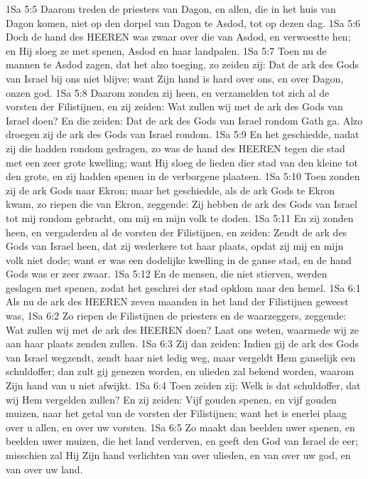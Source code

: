 1Sa 5:5  Daarom treden de priesters van Dagon, en allen, die in het huis van Dagon komen, niet op den dorpel van Dagon te Asdod, tot op dezen dag.
1Sa 5:6  Doch de hand des HEEREN was zwaar over die van Asdod, en verwoestte hen; en Hij sloeg ze met spenen, Asdod en haar landpalen.
1Sa 5:7  Toen nu de mannen te Asdod zagen, dat het alzo toeging, zo zeiden zij: Dat de ark des Gods van Israel bij ons niet blijve; want Zijn hand is hard over ons, en over Dagon, onzen god.
1Sa 5:8  Daarom zonden zij heen, en verzamelden tot zich al de vorsten der Filistijnen, en zij zeiden: Wat zullen wij met de ark des Gods van Israel doen? En die zeiden: Dat de ark des Gods van Israel rondom Gath ga. Alzo droegen zij de ark des Gods van Israel rondom.
1Sa 5:9  En het geschiedde, nadat zij die hadden rondom gedragen, zo was de hand des HEEREN tegen die stad met een zeer grote kwelling; want Hij sloeg de lieden dier stad van den kleine tot den grote, en zij hadden spenen in de verborgene plaatsen.
1Sa 5:10  Toen zonden zij de ark Gods naar Ekron; maar het geschiedde, als de ark Gods te Ekron kwam, zo riepen die van Ekron, zeggende: Zij hebben de ark des Gods van Israel tot mij rondom gebracht, om mij en mijn volk te doden.
1Sa 5:11  En zij zonden heen, en vergaderden al de vorsten der Filistijnen, en zeiden: Zendt de ark des Gods van Israel heen, dat zij wederkere tot haar plaats, opdat zij mij en mijn volk niet dode; want er was een dodelijke kwelling in de ganse stad, en de hand Gods was er zeer zwaar.
1Sa 5:12  En de mensen, die niet stierven, werden geslagen met spenen, zodat het geschrei der stad opklom naar den hemel.
1Sa 6:1  Als nu de ark des HEEREN zeven maanden in het land der Filistijnen geweest was,
1Sa 6:2  Zo riepen de Filistijnen de priesters en de waarzeggers, zeggende: Wat zullen wij met de ark des HEEREN doen? Laat ons weten, waarmede wij ze aan haar plaats zenden zullen.
1Sa 6:3  Zij dan zeiden: Indien gij de ark des Gods van Israel wegzendt, zendt haar niet ledig weg, maar vergeldt Hem ganselijk een schuldoffer; dan zult gij genezen worden, en ulieden zal bekend worden, waarom Zijn hand van u niet afwijkt.
1Sa 6:4  Toen zeiden zij: Welk is dat schuldoffer, dat wij Hem vergelden zullen? En zij zeiden: Vijf gouden spenen, en vijf gouden muizen, naar het getal van de vorsten der Filistijnen; want het is enerlei plaag over u allen, en over uw vorsten.
1Sa 6:5  Zo maakt dan beelden uwer spenen, en beelden uwer muizen, die het land verderven, en geeft den God van Israel de eer; misschien zal Hij Zijn hand verlichten van over ulieden, en van over uw god, en van over uw land.
